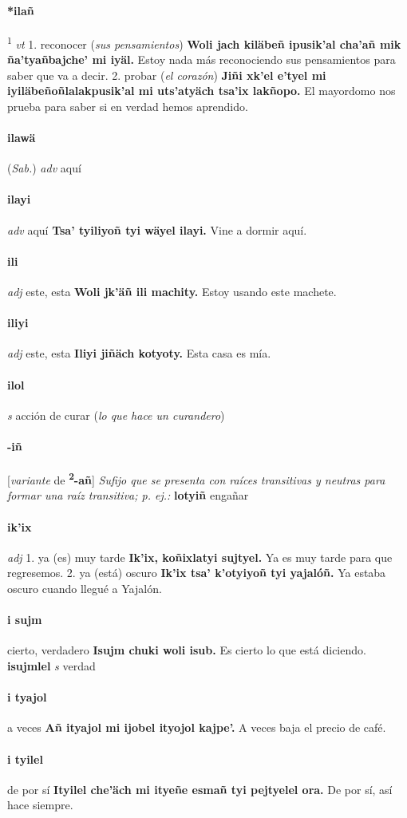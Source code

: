 \documentclass{scrbook}
\newcommand{\entry}[1]{\paragraph{#1}}
\newcommand{\onedefinition}[1]{#1.}
\newcommand{\defsuperscript}[1]{\textsuperscript{1}}
\newcommand{\nontranslationdef}[1]{\textit{#1}}
\newcommand{\partofspeech}[1]{\textit{#1}}
\newcommand{\spanishtranslation}[1]{#1}
\newcommand{\clarification}[1]{(\textit{#1})}
\newcommand{\cholexample}[1]{\textbf{#1}}
\newcommand{\exampletranslation}[1]{#1}
\newcommand{\relevantdialect}[1]{(\textit{#1})}
\newcommand{\secondaryentry}[1]{\\\textbf{#1}}
\newcommand{\secondpartofspeech}[1]{\textit{#1}}
\newcommand{\secondtranslation}[1]{#1}
\newcommand{\conjugationtense}[1]{[\textit{#1}}
\newcommand{\conjugationverb}[1]{de \textbf{#1}]}
\begin{document}
\begin{multicols}{2}
\entry{*ilañ}
\defsuperscript{2}
\partofspeech{vt}
\onedefinition{1}
\spanishtranslation{reconocer}
\clarification{sus pensamientos}
\cholexample{Woli jach kiläbeñ ipusik'al cha'añ mik ña'tyañbajche' mi iyäl.}
\exampletranslation{Estoy nada más reconociendo sus pensamientos para saber que va a decir.}
\onedefinition{2}
\spanishtranslation{probar}
\clarification{el corazón}
\cholexample{Jiñi xk'el e'tyel mi iyiläbeñoñlalakpusik'al mi uts'atyäch tsa'ix lakñopo.}
\exampletranslation{El mayordomo nos prueba para saber si en verdad hemos aprendido.}

\entry{ilawä}
\relevantdialect{Sab.}
\partofspeech{adv}
\spanishtranslation{aquí}

\entry{ilayi}
\partofspeech{adv}
\spanishtranslation{aquí}
\cholexample{Tsa' tyiliyoñ tyi wäyel ilayi.}
\exampletranslation{Vine a dormir aquí.}

\entry{ili}
\partofspeech{adj}
\spanishtranslation{este, esta}
\cholexample{Woli jk'äñ ili machity.}
\exampletranslation{Estoy usando este machete.}

\entry{iliyi}
\partofspeech{adj}
\spanishtranslation{este, esta}
\cholexample{Iliyi jiñäch kotyoty.}
\exampletranslation{Esta casa es mía.}

\entry{ilol}
\partofspeech{s}
\spanishtranslation{acción de curar}
\clarification{lo que hace un curandero}

\entry{-iñ}
\conjugationtense{variante}
\conjugationverb{\textsuperscript{2}-añ}
\nontranslationdef{Sufijo que se presenta con raíces transitivas y neutras para formar una raíz transitiva; p. ej.:}
\cholexample{lotyiñ}
\exampletranslation{engañar}

\entry{ik'ix}
\partofspeech{adj}
\onedefinition{1}
\spanishtranslation{ya (es) muy tarde}
\cholexample{Ik'ix, koñixlatyi sujtyel.}
\exampletranslation{Ya es muy tarde para que regresemos.}
\onedefinition{2}
\spanishtranslation{ya (está) oscuro}
\cholexample{Ik'ix tsa' k'otyiyoñ tyi yajalóñ.}
\exampletranslation{Ya estaba oscuro cuando llegué a Yajalón.}

\entry{i sujm}
\spanishtranslation{cierto, verdadero}
\cholexample{Isujm chuki woli isub.}
\exampletranslation{Es cierto lo que está diciendo.}
\secondaryentry{isujmlel}
\secondpartofspeech{s}
\secondtranslation{verdad}

\entry{i tyajol}
\spanishtranslation{a veces}
\cholexample{Añ ityajol mi ijobel ityojol kajpe'.}
\exampletranslation{A veces baja el precio de café.}

\entry{i tyilel}
\spanishtranslation{de por sí}
\cholexample{Ityilel che'äch mi ityeñe esmañ tyi pejtyelel ora.}
\exampletranslation{De por sí, así hace siempre.}


\end{multicols}
\end{document}
